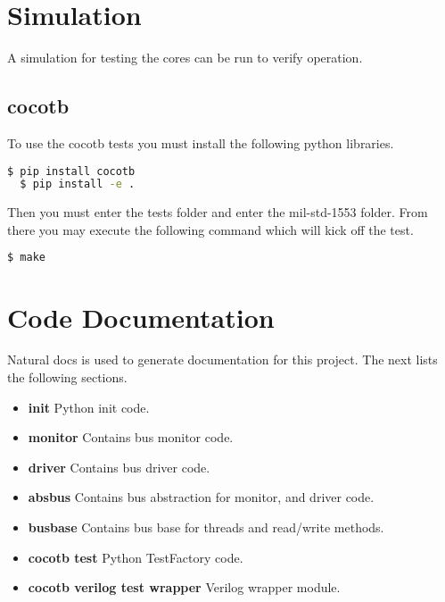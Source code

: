 \newpage

\section{Simulation}
\par
A simulation for testing the cores can be run to verify operation.

\subsection{cocotb}
\par
To use the cocotb tests you must install the following python libraries.
\begin{lstlisting}[language=bash]
  $ pip install cocotb
  $ pip install -e .
\end{lstlisting}

Then you must enter the tests folder and enter the mil-std-1553 folder. From there you may execute the following command
which will kick off the test.
\begin{lstlisting}[language=bash]
  $ make
\end{lstlisting}

\newpage

\section{Code Documentation} \label{Code Documentation}

\par
Natural docs is used to generate documentation for this project. The next lists the following sections.

\begin{itemize}
  \item \textbf{init} Python init code.\\
  \item \textbf{monitor} Contains bus monitor code.\\
  \item \textbf{driver} Contains bus driver code.\\
  \item \textbf{absbus} Contains bus abstraction for monitor, and driver code.\\
  \item \textbf{busbase} Contains bus base for threads and read/write methods.\\
  \item \textbf{cocotb test} Python TestFactory code.\\
  \item \textbf{cocotb verilog test wrapper} Verilog wrapper module.\\
\end{itemize}

